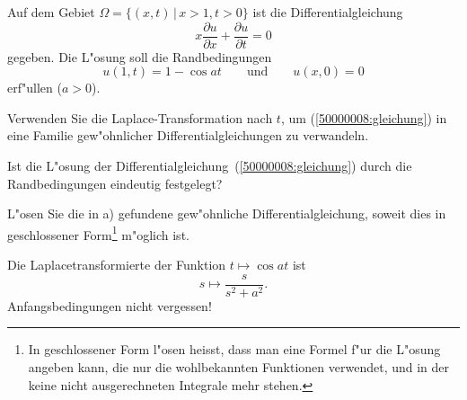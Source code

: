 Auf dem Gebiet $\Omega=\{(x,t)\,|\, x>1,t > 0\}$
ist die Differentialgleichung
\begin{equation}
x\frac{\partial u}{\partial x}+\frac{\partial u}{\partial t}=0
\label{50000008:gleichung}
\end{equation}
gegeben. Die L"osung soll die Randbedingungen
\[
u(1,t)=1-\cos at
\qquad
\text{und}
\qquad
u(x,0)=0
\]
erf"ullen ($a > 0$).
\begin{teilaufgaben}
\item Verwenden Sie die Laplace-Transformation nach $t$,
um (\ref{50000008:gleichung}) in eine Familie gew"ohnlicher
Differentialgleichungen zu verwandeln.
\item 
Ist die L"osung der Differentialgleichung~(\ref{50000008:gleichung}) durch
die Randbedingungen eindeutig festgelegt?
\item
L"osen Sie die in a) gefundene gew"ohnliche Differentialgleichung,
soweit dies in geschlossener Form\footnote{In geschlossener Form
l"osen heisst, dass man eine Formel f"ur die L"osung angeben kann, die 
nur die wohlbekannten Funktionen verwendet, und in der keine nicht
ausgerechneten Integrale mehr stehen.
} m"oglich ist.
\end{teilaufgaben}

\begin{hinweis}
Die Laplacetransformierte der Funktion $t\mapsto\cos at$ ist
\[
s\mapsto
\frac{s}{s^2+a^2}.
\]
Anfangsbedingungen nicht vergessen!
\end{hinweis}


